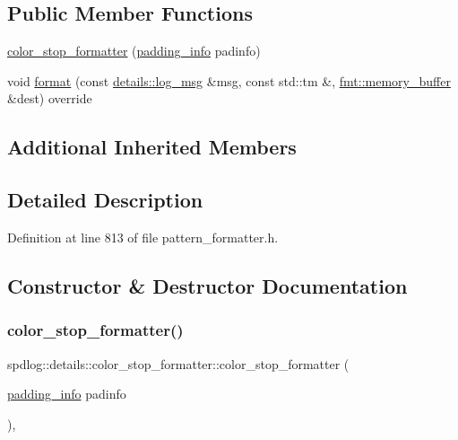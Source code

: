 \subsection*{Public Member Functions}
\begin{DoxyCompactItemize}
\item 
\hyperlink{classspdlog_1_1details_1_1color__stop__formatter_ae91bec8b6dec2965b7406026925d1cdc}{color\+\_\+stop\+\_\+formatter} (\hyperlink{structspdlog_1_1details_1_1padding__info}{padding\+\_\+info} padinfo)
\item 
void \hyperlink{classspdlog_1_1details_1_1color__stop__formatter_ac59e274cc3d37db75f0e7ea3dc484209}{format} (const \hyperlink{structspdlog_1_1details_1_1log__msg}{details\+::log\+\_\+msg} \&msg, const std\+::tm \&, \hyperlink{format_8h_a21cbf729f69302f578e6db21c5e9e0d2}{fmt\+::memory\+\_\+buffer} \&dest) override
\end{DoxyCompactItemize}
\subsection*{Additional Inherited Members}


\subsection{Detailed Description}


Definition at line 813 of file pattern\+\_\+formatter.\+h.



\subsection{Constructor \& Destructor Documentation}
\mbox{\label{classspdlog_1_1details_1_1color__stop__formatter_ae91bec8b6dec2965b7406026925d1cdc}} 
\subsubsection{\texorpdfstring{color\+\_\+stop\+\_\+formatter()}{color\_stop\_formatter()}}
{\footnotesize\ttfamily spdlog\+::details\+::color\+\_\+stop\+\_\+formatter\+::color\+\_\+stop\+\_\+formatter (\begin{DoxyParamCaption}\item[{\hyperlink{structspdlog_1_1details_1_1padding__info}{padding\+\_\+info}}]{padinfo }\end{DoxyParamCaption})\hspace{0.3cm}{\ttfamily [inline]}, {\ttfamily [explicit]}}



